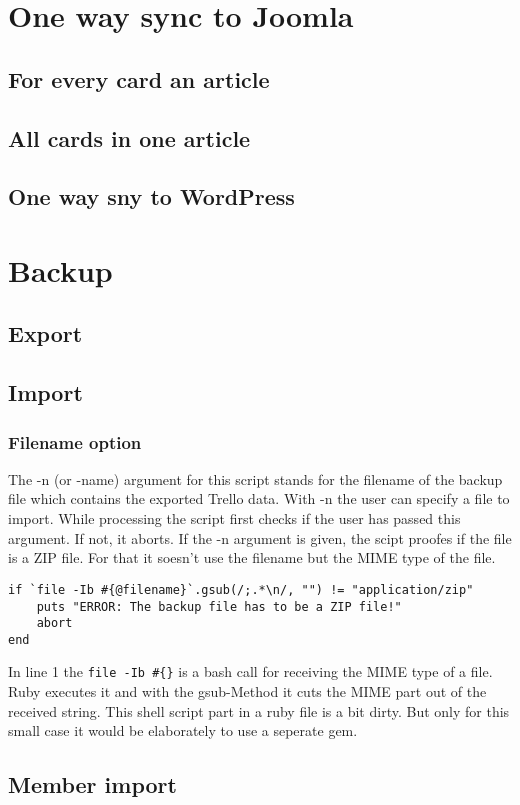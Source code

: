 \section{One way sync to Joomla}

\subsection{For every card an article}

\subsection{All cards in one article}

\subsection{One way sny to WordPress}

\section{Backup}

\subsection{Export}

\subsection{Import}

\subsubsection{Filename option}
The -n (or -name) argument for this script stands for the filename of the backup file which contains the  exported Trello data. With -n the user can specify a file to import. While processing the script first checks if the user has passed this argument. If not, it aborts. If the -n argument is given, the scipt proofes if the file is a ZIP file. For that it soesn't use the filename but the MIME type of the file.

\begin{lstlisting}[float=htb, caption=Checking if the file has the MIME type \textquotedblleft application/zip\textquotedblright, label=listing008]
if `file -Ib #{@filename}`.gsub(/;.*\n/, "") != "application/zip"
	puts "ERROR: The backup file has to be a ZIP file!"
	abort
end
\end{lstlisting}

	
In line 1 the \texttt{file -Ib \#\{\@filename\}} is a bash call for receiving the MIME type of a file. Ruby executes it and with the gsub-Method it cuts the MIME part out of the received string. This shell script part in a ruby file is a bit dirty. But only for this small case it would be elaborately to use a seperate gem.


\subsection{Member import}

